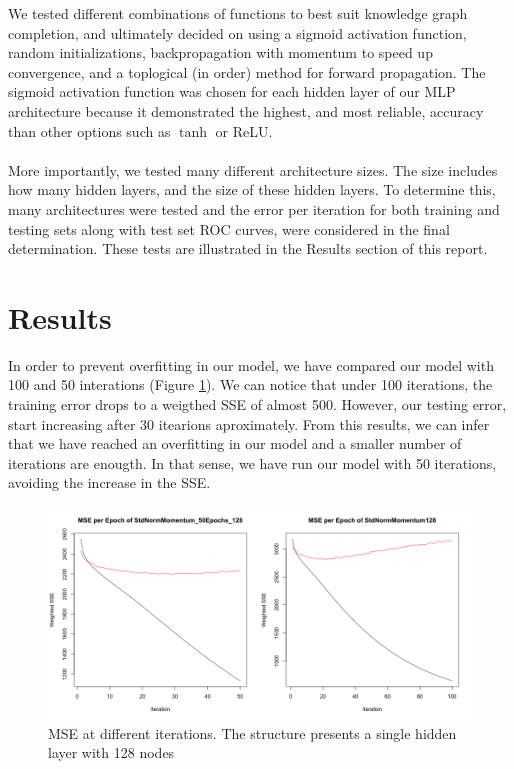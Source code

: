 \documentclass[11.5pt]{article}
\newcounter{Figure}
\newcounter{graphics}
\begin{document}
We tested different combinations of functions to best suit knowledge graph completion, and ultimately decided on using a sigmoid activation function, random initializations,  backpropagation with momentum to speed up convergence, and a toplogical (in order) method for forward propagation. The sigmoid activation function was chosen for each hidden layer of our MLP architecture because it demonstrated the highest, and most reliable, accuracy than other options such as $\tanh$ or ReLU.

\paragraph{} More importantly, we tested many different architecture sizes. The size includes how many hidden layers, and the size of these hidden layers. To determine this, 
many architectures were tested and the error per iteration for both training and testing sets along with test set ROC curves, were considered in the final determination. These tests are illustrated in the Results section of this report.


\section{Results}

In order to prevent overfitting in our model, we have compared our model with 100 and 50 interations (Figure \ref{50_100_128.png}). We can notice that under 100 iterations, the training error drops to a weigthed SSE of almost 500. However, our testing error, start increasing after 30 itearions aproximately. From this results, we can infer that we have reached an overfitting in our model and a smaller number of iterations are enougth. In that sense, we have run our model with 50 iterations, avoiding the increase in the SSE.\par
 

\begin{figure}[h!]
 \includegraphics[width=1\textwidth]{report_mlp/50_100_128.png}
  \caption{\small MSE at different iterations. The structure presents a single hidden layer with 128 nodes}
  \label{50_100_128.png}
\end{figure}
\end{document}
